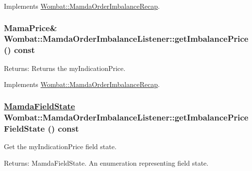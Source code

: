 Implements \hyperlink{classWombat_1_1MamdaOrderImbalanceRecap_7e2c182069b4e4ec378447998ee72819}{Wombat::Mamda\-Order\-Imbalance\-Recap}.\hypertarget{classWombat_1_1MamdaOrderImbalanceListener_ecc32af60d82a040a0ca3e7c79075fc5}{
\subsubsection[getImbalancePrice]{\setlength{\rightskip}{0pt plus 5cm}Mama\-Price\& Wombat::Mamda\-Order\-Imbalance\-Listener::get\-Imbalance\-Price () const}}
\label{classWombat_1_1MamdaOrderImbalanceListener_ecc32af60d82a040a0ca3e7c79075fc5}


\begin{Desc}
\item[Returns:]Returns the my\-Indication\-Price. \end{Desc}


Implements \hyperlink{classWombat_1_1MamdaOrderImbalanceRecap_2de9b81042cfa08034717b7930d436f0}{Wombat::Mamda\-Order\-Imbalance\-Recap}.\hypertarget{classWombat_1_1MamdaOrderImbalanceListener_44f4f51fd6248a092825200e42c008a5}{
\subsubsection[getImbalancePriceFieldState]{\setlength{\rightskip}{0pt plus 5cm}\hyperlink{namespaceWombat_93aac974f2ab713554fd12a1fa3b7d2a}{Mamda\-Field\-State} Wombat::Mamda\-Order\-Imbalance\-Listener::get\-Imbalance\-Price\-Field\-State () const}}
\label{classWombat_1_1MamdaOrderImbalanceListener_44f4f51fd6248a092825200e42c008a5}


Get the my\-Indication\-Price field state. 

\begin{Desc}
\item[Returns:]Mamda\-Field\-State. An enumeration representing field state. \end{Desc}


